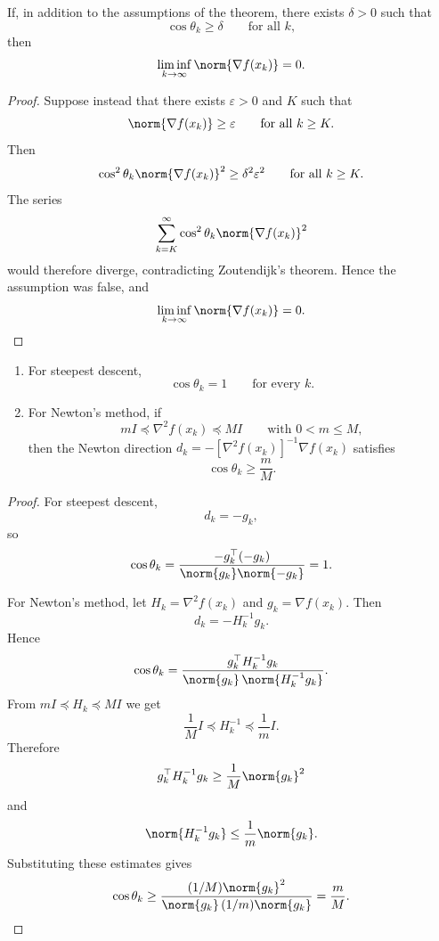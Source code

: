 \begin{corollary}\label{cor:l2-a-standard-consequence-of-zoutendijk}
	If, in addition to the assumptions of the theorem, there exists $\delta>0$ such that
	\[
		\cos \theta_k \ge \delta
		\qquad \text{for all } k,
	\]
	then
	\[
		\liminf_{k \to \infty} \norm{\nabla f(x_k)} = 0.
	\]
\end{corollary}
\begin{proof}
	Suppose instead that there exists $\varepsilon>0$ and $K$ such that
	\[
		\norm{\nabla f(x_k)} \ge \varepsilon
		\qquad \text{for all } k \ge K.
	\]
	Then
	\[
		\cos^2 \theta_k \norm{\nabla f(x_k)}^2
		\ge
		\delta^2 \varepsilon^2
		\qquad \text{for all } k \ge K.
	\]
	The series
	\[
		\sum_{k=K}^\infty \cos^2 \theta_k \norm{\nabla f(x_k)}^2
	\]
	would therefore diverge, contradicting Zoutendijk's theorem. Hence the assumption was false, and
	\[
		\liminf_{k \to \infty} \norm{\nabla f(x_k)}=0.
	\]
\end{proof}

\begin{proposition}\label{prop:l2-angle-bounds-for-steepest-descent-and-newton}
	\begin{enumerate}[label=(\roman*)]
		\item For steepest descent,
		      \[
			      \cos \theta_k = 1
			      \qquad \text{for every } k.
		      \]
		\item For Newton's method, if
		      \[
			      mI \preceq \nabla^2 f(x_k) \preceq MI
		      \qquad \text{with } 0<m \le M,
		      \]
		      then the Newton direction $d_k=-[\nabla^2 f(x_k)]^{-1}\nabla f(x_k)$ satisfies
		      \[
			      \cos \theta_k \ge \frac{m}{M}.
		      \]
	\end{enumerate}
\end{proposition}
\begin{proof}
	For steepest descent,
	\[
		d_k=-g_k,
	\]
	so
	\[
		\cos \theta_k
		=
		\frac{-g_k^\top(-g_k)}{\norm{g_k}\norm{-g_k}}
		=1.
	\]

	For Newton's method, let $H_k=\nabla^2 f(x_k)$ and $g_k=\nabla f(x_k)$. Then
	\[
		d_k=-H_k^{-1}g_k.
	\]
	Hence
	\[
		\cos \theta_k
		=
		\frac{g_k^\top H_k^{-1}g_k}{\norm{g_k}\,\norm{H_k^{-1}g_k}}.
	\]
	From $mI \preceq H_k \preceq MI$ we get
	\[
		\frac{1}{M}I \preceq H_k^{-1} \preceq \frac{1}{m}I.
	\]
	Therefore
	\[
		g_k^\top H_k^{-1}g_k \ge \frac{1}{M}\norm{g_k}^2
	\]
	and
	\[
		\norm{H_k^{-1}g_k} \le \frac{1}{m}\norm{g_k}.
	\]
	Substituting these estimates gives
	\[
		\cos \theta_k
		\ge
		\frac{(1/M)\norm{g_k}^2}{\norm{g_k}\,(1/m)\norm{g_k}}
		=
		\frac{m}{M}.
	\]
\end{proof}

